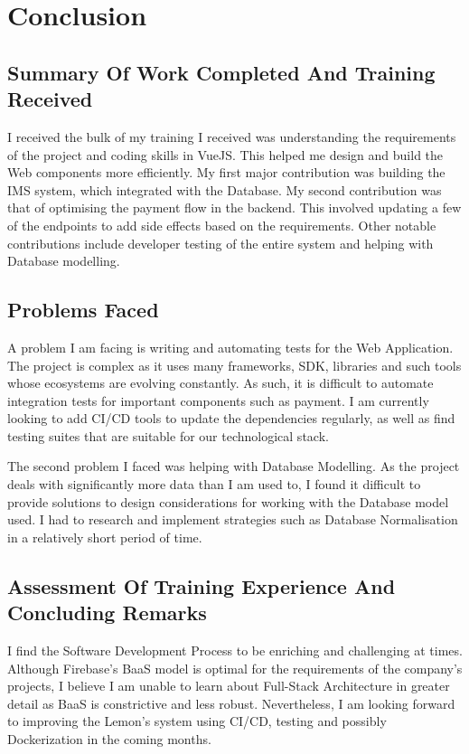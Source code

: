 \section{Conclusion}
\subsection{Summary Of Work Completed And Training Received}
\noindent
I received the bulk of my training I received was understanding the requirements of the project and coding skills in VueJS. This helped
me design and build the Web components more efficiently.
\noindent
My first major contribution was building the IMS system, which integrated with the Database.
\noindent
My second contribution was that of optimising the payment flow in the backend. This involved updating a few of the endpoints to add side effects based on the requirements.
\noindent
Other notable contributions include developer testing of the entire system and helping with Database modelling.
 
\subsection{Problems Faced}
\noindent
A problem I am facing is writing and automating tests for the Web Application. The project is complex as it uses many frameworks, SDK, libraries
and such tools whose ecosystems are evolving constantly. As such, it is difficult to automate integration tests for important components such as
payment. I am currently looking to add CI/CD tools to update the dependencies regularly, as well as find testing suites that
are suitable for our technological stack.

\noindent
The second problem I faced was helping with Database Modelling. As the project deals with significantly more data than
I am used to, I found it difficult to provide solutions to design considerations for working with the Database model used. I had to 
research and implement strategies such as Database Normalisation in a relatively short period of time.

\subsection{Assessment Of Training Experience And Concluding Remarks}
\noindent
I find the Software Development Process to be enriching and challenging at times. Although Firebase's BaaS model is optimal for 
the requirements of the company's projects, I believe I am unable to learn about Full-Stack Architecture in greater detail as BaaS is constrictive and less robust.
Nevertheless, I am looking forward to improving the Lemon's system using CI/CD, testing and possibly Dockerization in the coming months.

